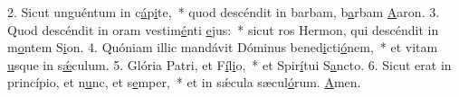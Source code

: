 2. Sicut unguéntum in c\uline{á}p\uline{i}te,~* quod descéndit in barbam, b\uline{a}rbam \uline{A}aron.
3. Quod descéndit in oram vestim\uline{é}nti \uline{e}jus:~* sicut ros Hermon, qui descéndit in m\uline{o}ntem S\uline{i}on.
4. Quóniam illic mandávit Dóminus bened\uline{i}cti\uline{ó}nem,~* et vitam \uline{u}sque in s\uline{ǽ}culum.
5. Glória Patri, et F\uline{í}l\uline{i}o,~* et Spir\uline{í}tui S\uline{a}ncto.
6. Sicut erat in princípio, et n\uline{u}nc, et s\uline{e}mper,~* et in sǽcula sæcul\uline{ó}rum. \uline{A}men.
